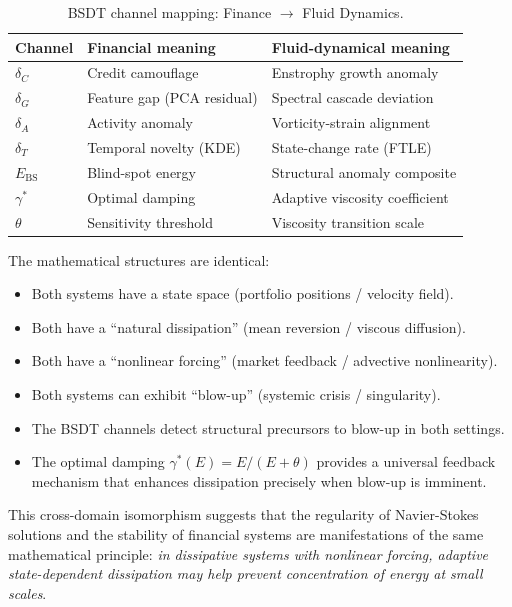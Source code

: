 \documentclass[12pt, a4paper]{article}
\newcommand{\Ebs}{E_{\mathrm{BS}}}
\newcommand{\gammastar}{\gamma^*}
\begin{document}
\begin{table}[H]
\centering
\caption{BSDT channel mapping: Finance $\to$ Fluid Dynamics.}
\label{tab:transfer}
\begin{tabular}{@{}lll@{}}
\toprule
Channel & Financial meaning & Fluid-dynamical meaning \\
\midrule
$\delta_C$ & Credit camouflage & Enstrophy growth anomaly \\
$\delta_G$ & Feature gap (PCA residual) & Spectral cascade deviation \\
$\delta_A$ & Activity anomaly & Vorticity-strain alignment \\
$\delta_T$ & Temporal novelty (KDE) & State-change rate (FTLE) \\
$\Ebs$ & Blind-spot energy & Structural anomaly composite \\
$\gammastar$ & Optimal damping & Adaptive viscosity coefficient \\
$\theta$ & Sensitivity threshold & Viscosity transition scale \\
\bottomrule
\end{tabular}
\end{table}

The mathematical structures are identical:
\begin{itemize}
\item Both systems have a state space (portfolio positions / velocity field).
\item Both have a ``natural dissipation'' (mean reversion / viscous diffusion).
\item Both have a ``nonlinear forcing'' (market feedback / advective nonlinearity).
\item Both systems can exhibit ``blow-up'' (systemic crisis / singularity).
\item The BSDT channels detect structural precursors to blow-up in both settings.
\item The optimal damping $\gammastar(E) = E/(E+\theta)$ provides a universal
  feedback mechanism that enhances dissipation precisely when blow-up is imminent.
\end{itemize}

This cross-domain isomorphism suggests that the regularity of
Navier-Stokes solutions and the stability of financial systems
are manifestations of the same mathematical principle:
\emph{in dissipative systems with nonlinear forcing,
adaptive state-dependent dissipation may help prevent concentration
of energy at small scales}.


\end{document}
